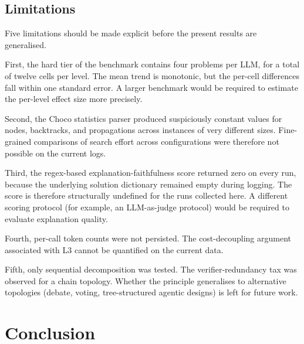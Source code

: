 \documentclass[11pt,a4paper]{article}
\begin{document}
\subsection{Limitations}\label{sec:discussion:limits}
Five limitations should be made explicit before the present results are generalised.

First, the hard tier of the benchmark contains four problems per LLM, for a total of twelve cells per level. The mean trend is monotonic, but the per-cell differences fall within one standard error. A larger benchmark would be required to estimate the per-level effect size more precisely.

Second, the Choco statistics parser produced suspiciously constant values for nodes, backtracks, and propagations across instances of very different sizes. Fine-grained comparisons of search effort across configurations were therefore not possible on the current logs.

Third, the regex-based explanation-faithfulness score returned zero on every run, because the underlying solution dictionary remained empty during logging. The score is therefore structurally undefined for the runs collected here. A different scoring protocol (for example, an LLM-as-judge protocol) would be required to evaluate explanation quality.

Fourth, per-call token counts were not persisted. The cost-decoupling argument associated with L3 cannot be quantified on the current data.

Fifth, only sequential decomposition was tested. The verifier-redundancy tax was observed for a chain topology. Whether the principle generalises to alternative topologies (debate, voting, tree-structured agentic designs) is left for future work.

\section{Conclusion}\label{sec:conclusion}
\end{document}
